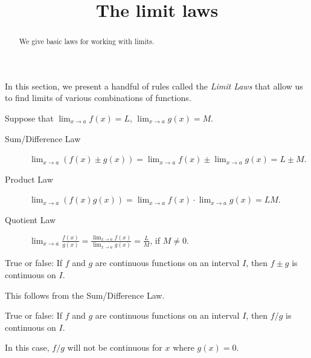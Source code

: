 \documentclass{ximera}
\title[Dig-In:]{The limit laws}
\begin{document}
\begin{abstract}
We give basic laws for working with limits. 
\end{abstract}
\maketitle

In this section, we present a handful of rules called the \textit{Limit Laws}
that allow us to find limits of various combinations of functions.

\begin{theorem}\label{theorem:limit-laws}
Suppose that $\lim_{x\to a}f(x)=L$, $\lim_{x\to a}g(x)=M$.
\begin{description}
\item[Sum/Difference Law] $\lim_{x\to a} (f(x) \pm g(x)) =
  \lim_{x\to a}f(x) \pm \lim_{x\to a}g(x)=L \pm M$.
\item[Product Law]  $\lim_{x\to a} (f(x)g(x)) = \lim_{x\to
  a}f(x)\cdot\lim_{x\to a}g(x)=LM$.
\item[Quotient Law]  $\lim_{x\to a} \frac{f(x)}{g(x)} =
  \frac{\lim_{x\to a}f(x)}{\lim_{x\to a}g(x)}=\frac{L}{M}$, if
  $M\ne0$.
\end{description}
\label{thm:limit laws}
\end{theorem}

\begin{question}
  True or false: If $f$ and $g$ are continuous functions on an
  interval $I$, then $f\pm g$ is continuous on $I$.
  \begin{multipleChoice}
  \end{multipleChoice}
  \begin{feedback}
    This follows from the Sum/Difference Law.
  \end{feedback}
\end{question}

\begin{question}
  True or false: If $f$ and $g$ are continuous functions on an
  interval $I$, then $f/g$ is continuous on $I$.
  \begin{multipleChoice}
  \end{multipleChoice}
  \begin{feedback}
    In this case, $f/g$ will not be continuous for $x$ where $g(x) =
    0$.
  \end{feedback}
\end{question}
\end{document}
